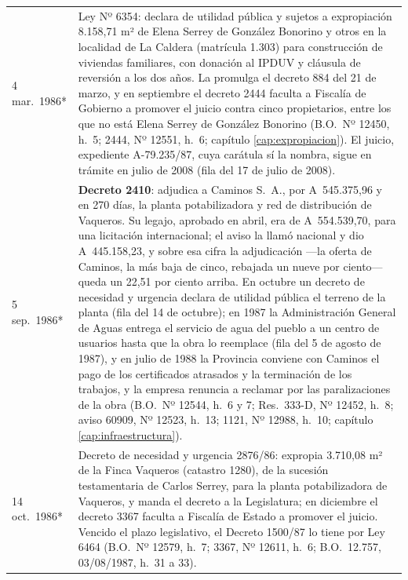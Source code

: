 \begin{longtable}{@{}p{2.7cm}p{10.3cm}@{}}
4 mar.\ 1986* & Ley Nº 6354: declara de utilidad pública y sujetos a expropiación 8.158,71 m² de Elena Serrey\index{Serrey, Elena} de González Bonorino y otros en la localidad de La Caldera (matrícula 1.303) para construcción de viviendas familiares, con donación al IPDUV y cláusula de reversión a los dos años. La promulga el decreto 884 del 21 de marzo, y en septiembre el decreto 2444 faculta a Fiscalía de Gobierno a promover el juicio contra cinco propietarios, entre los que no está Elena Serrey de González Bonorino (B.O.\ Nº 12450, h.\ 5; 2444, Nº 12551, h.\ 6; capítulo \ref{cap:expropiacion}). El juicio, expediente A-79.235/87, cuya carátula sí la nombra, sigue en trámite en julio de 2008 (fila del 17 de julio de 2008). \\
5 sep.\ 1986* & \textbf{Decreto 2410}: adjudica a Caminos S.\ A., por A~545.375,96 y en 270 días, la planta potabilizadora y red de distribución de Vaqueros. Su legajo, aprobado en abril, era de A~554.539,70, para una licitación internacional; el aviso la llamó nacional y dio A~445.158,23, y sobre esa cifra la adjudicación ---la oferta de Caminos, la más baja de cinco, rebajada un nueve por ciento--- queda un 22,51 por ciento arriba. En octubre un decreto de necesidad y urgencia declara de utilidad pública el terreno de la planta (fila del 14 de octubre); en 1987 la Administración General de Aguas entrega el servicio de agua del pueblo a un centro de usuarios hasta que la obra lo reemplace (fila del 5 de agosto de 1987), y en julio de 1988 la Provincia conviene con Caminos el pago de los certificados atrasados y la terminación de los trabajos, y la empresa renuncia a reclamar por las paralizaciones de la obra (B.O.\ Nº 12544, h.\ 6 y 7; Res.\ 333-D, Nº 12452, h.\ 8; aviso 60909, Nº 12523, h.\ 13; 1121, Nº 12988, h.\ 10; capítulo \ref{cap:infraestructura}). \\
14 oct.\ 1986* & Decreto de necesidad y urgencia 2876/86: expropia 3.710,08 m² de la Finca Vaqueros (catastro 1280), de la sucesión testamentaria de Carlos Serrey, para la planta potabilizadora de Vaqueros, y manda el decreto a la Legislatura; en diciembre el decreto 3367 faculta a Fiscalía de Estado a promover el juicio. Vencido el plazo legislativo, el Decreto 1500/87 lo tiene por Ley 6464 (B.O.\ Nº 12579, h.\ 7; 3367, Nº 12611, h.\ 6; B.O.\ 12.757, 03/08/1987, h.\ 31 a 33). \\

\end{longtable}
